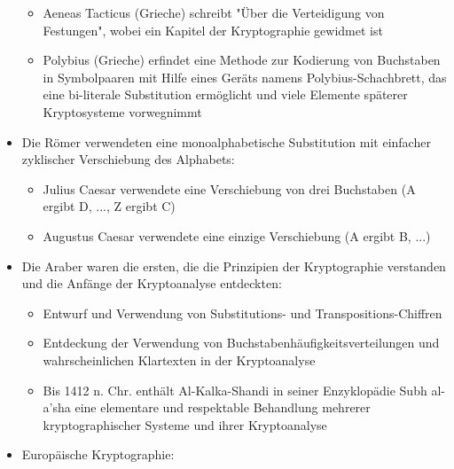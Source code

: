 \documentclass[a4paper]{article}
\begin{document}
\begin{multicols}{3}
\begin{itemize}
              \begin{itemize}
                  \item
                        Aeneas Tacticus (Grieche) schreibt "Über die Verteidigung von
                        Festungen", wobei ein Kapitel der Kryptographie gewidmet ist
                  \item
                        Polybius (Grieche) erfindet eine Methode zur Kodierung von
                        Buchstaben in Symbolpaaren mit Hilfe eines Geräts namens
                        Polybius-Schachbrett, das eine bi-literale Substitution ermöglicht
                        und viele Elemente späterer Kryptosysteme vorwegnimmt
              \end{itemize}
        \item
              Die Römer verwendeten eine monoalphabetische Substitution mit
              einfacher zyklischer Verschiebung des Alphabets:

              \begin{itemize}
                  \item
                        Julius Caesar verwendete eine Verschiebung von drei Buchstaben (A
                        ergibt D, ..., Z ergibt C)
                  \item
                        Augustus Caesar verwendete eine einzige Verschiebung (A ergibt B,
                        ...)
              \end{itemize}
        \item
              Die Araber waren die ersten, die die Prinzipien der Kryptographie
              verstanden und die Anfänge der Kryptoanalyse entdeckten:

              \begin{itemize}
                  \item
                        Entwurf und Verwendung von Substitutions- und
                        Transpositions-Chiffren
                  \item
                        Entdeckung der Verwendung von Buchstabenhäufigkeitsverteilungen und
                        wahrscheinlichen Klartexten in der Kryptoanalyse
                  \item
                        Bis 1412 n. Chr. enthält Al-Kalka-Shandi in seiner Enzyklopädie Subh
                        al-a'sha eine elementare und respektable Behandlung mehrerer
                        kryptographischer Systeme und ihrer Kryptoanalyse
              \end{itemize}
        \item
              Europäische Kryptographie:


\end{itemize}
\end{multicols}
\end{document}
